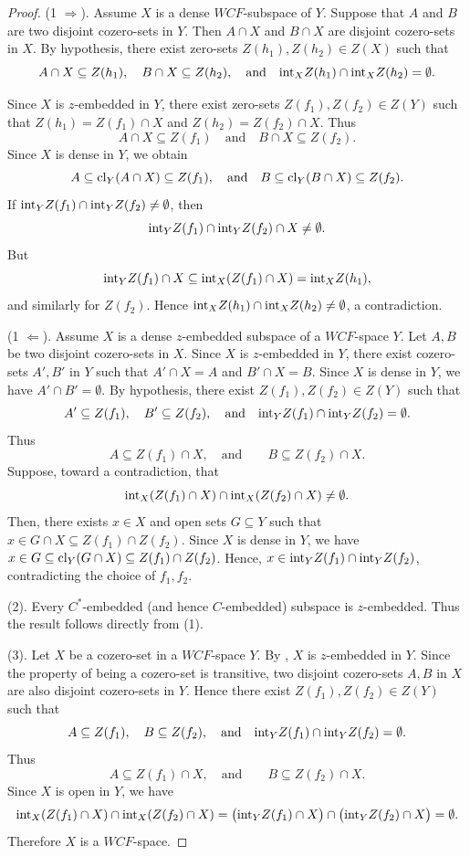 \documentclass{amsart}
\theoremstyle{definition}
\theoremstyle{remark}
\numberwithin{equation}{section}
\newcommand{\rint}{{\rm int}}
\newcommand{\rcl}{{\rm cl}}
\theoremstyle{definition}\newtheorem{thm}{Theorem}[section]
\theoremstyle{definition}\newtheorem{cor}[thm]{Corollary}
\theoremstyle{definition}\newtheorem{lem}[thm]{Lemma}
\theoremstyle{definition}\newtheorem{prop}[thm]{Proposition}
\theoremstyle{definition}\newtheorem{defn}[thm]{Definition}
\theoremstyle{definition}\newtheorem{Rem}[thm]{Remark}
\theoremstyle{remark}\newtheorem{rem}[thm]{Remark}
\theoremstyle{definition}\newtheorem{exam}[thm]{Example}
\theoremstyle{definition}\newtheorem{qu}[thm]{question}
\begin{document}
\begin{proof}
(1 $\Rightarrow$).  
Assume $X$ is a dense $WCF$-subspace of $Y$. Suppose that $A$ and $B$ are two disjoint cozero-sets in $Y$.  
Then $A\cap X$ and $B\cap X$ are disjoint cozero-sets in $X$. By hypothesis, there exist zero-sets $Z(h_1),Z(h_2)\in Z(X)$ such that
\[
A\cap X \subseteq Z(h_1), \quad B\cap X \subseteq Z(h_2),
\quad \text{and} \quad \rint_X Z(h_1)\cap \rint_X Z(h_2)=\emptyset.
\]

Since $X$ is $z$-embedded in $Y$, there exist zero-sets $Z(f_1),Z(f_2)\in Z(Y)$ such that  
$Z(h_1)=Z(f_1)\cap X$ and $Z(h_2)=Z(f_2)\cap X$.  
Thus
\[
A\cap X \subseteq Z(f_1)\quad\text{and} \quad B\cap X \subseteq Z(f_2).
\]
Since $X$ is dense in $Y$, we obtain
\[
A\subseteq \rcl_Y(A\cap X) \subseteq Z(f_1), 
\quad\text{and}\quad
B\subseteq \rcl_Y(B\cap X) \subseteq Z(f_2).
\]
If $\rint_Y Z(f_1)\cap \rint_Y Z(f_2)\neq\emptyset$, then
\[
\rint_Y Z(f_1)\cap \rint_Y Z(f_2)\cap X \neq \emptyset.
\]
But
\[
\rint_Y Z(f_1)\cap X \subseteq \rint_X(Z(f_1)\cap X)=\rint_X Z(h_1),
\]
and similarly for $Z(f_2)$.  
Hence $\rint_X Z(h_1)\cap \rint_X Z(h_2)\neq\emptyset$, a contradiction.  


(1 $\Leftarrow$).  
Assume $X$ is a dense $z$-embedded subspace of a $WCF$-space $Y$.  
Let $A,B$ be two disjoint cozero-sets in $X$.  
Since $X$ is $z$-embedded in $Y$, there exist cozero-sets $A',B'$ in $Y$ such that  
$A' \cap X=A$ and $B' \cap X=B$.  
Since $X$ is dense in $Y$, we have $A'\cap B'=\emptyset$. By hypothesis, there exist $Z(f_1),Z(f_2)\in Z(Y)$ such that
\[
A' \subseteq Z(f_1), \quad B' \subseteq Z(f_2), 
\quad \text{and} \quad \rint_Y Z(f_1)\cap \rint_Y Z(f_2)=\emptyset.
\]
Thus
\[
A\subseteq Z(f_1)\cap X,\quad\text{and} \qquad B\subseteq Z(f_2)\cap X.
\]
Suppose, toward a contradiction, that
\[
\rint_X(Z(f_1)\cap X)\cap \rint_X(Z(f_2)\cap X)\neq\emptyset.
\]
Then, there exists $x\in X$ and open sets $G\subseteq Y$ such that  $x\in G\cap X \subseteq Z(f_1)\cap Z(f_2)$. Since $X$ is dense in $Y$, we have $x\in G \subseteq \rcl_Y(G\cap X)\subseteq Z(f_1)\cap Z(f_2)$. Hence, $x\in \rint_Y Z(f_1)\cap \rint_Y Z(f_2)$, contradicting the choice of $f_1,f_2$.  

(2). Every $C^*$-embedded (and hence $C$-embedded) subspace is $z$-embedded.  
Thus the result follows directly from (1).  

(3).  
Let $X$ be a cozero-set in a $WCF$-space $Y$.  
By \cite[Proposition~1.1]{BH}, $X$ is $z$-embedded in $Y$.  
Since the property of being a cozero-set is transitive, two disjoint cozero-sets $A,B$ in $X$ are also disjoint cozero-sets in $Y$.  Hence there exist $Z(f_1),Z(f_2)\in Z(Y)$ such that
\[
A\subseteq Z(f_1), \quad B\subseteq Z(f_2), 
\quad \text{and} \quad \rint_Y Z(f_1)\cap \rint_Y Z(f_2)=\emptyset.
\]
Thus
\[
A\subseteq Z(f_1)\cap X,\quad\text{and} \qquad B\subseteq Z(f_2)\cap X.
\]
Since $X$ is open in $Y$, we have
\[
\rint_X(Z(f_1)\cap X)\cap \rint_X(Z(f_2)\cap X) 
= \big(\rint_Y Z(f_1)\cap X\big)\cap \big(\rint_Y Z(f_2)\cap X\big)=\emptyset.
\]
Therefore $X$ is a $WCF$-space.  
\end{proof}
\end{document}

